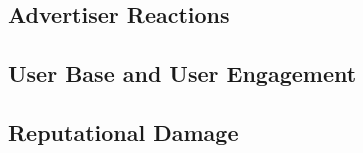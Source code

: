 \documentclass[12pt, a4paper]{article}
\begin{document}
\subsection*{Advertiser Reactions}


\subsection*{User Base and User Engagement}


\subsection*{Reputational Damage}




\end{document}
